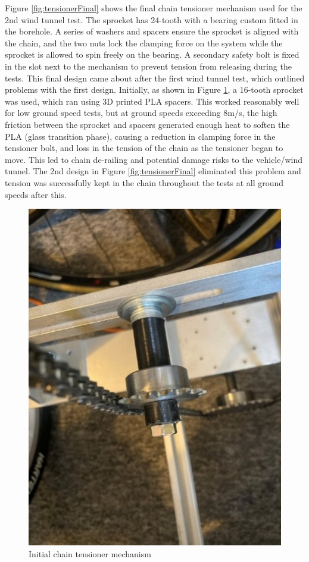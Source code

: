 Figure \ref{fig:tensionerFinal} shows the final chain tensioner mechanism used for the 2nd wind tunnel test. The sprocket has 24-tooth with a bearing custom fitted in the borehole. A series of washers and spacers ensure the sprocket is aligned with the chain, and the two nuts lock the clamping force on the system while the sprocket is allowed to spin freely on the bearing. A secondary safety bolt is fixed in the slot next to the mechanism to prevent tension from releasing during the tests. This final design came about after the first wind tunnel test, which outlined problems with the first design. Initially, as shown in Figure \ref{fig:tensionerInitial}, a 16-tooth sprocket was used, which ran using 3D printed PLA spacers. This worked reasonably well for low ground speed tests, but at ground speeds exceeding 8m/s, the high friction between the sprocket and spacers generated enough heat to soften the PLA (glass transition phase), causing a reduction in clamping force in the tensioner bolt, and loss in the tension of the chain as the tensioner began to move. This led to chain de-railing and potential damage risks to the vehicle/wind tunnel. The 2nd design in Figure \ref{fig:tensionerFinal} eliminated this problem and tension was successfully kept in the chain throughout the tests at all ground speeds after this.

\begin{figure}[!htbp]
    \centering
    \includegraphics{images/part9/chainTensionerInitial.jpg}
    \caption{Initial chain tensioner mechanism}
    \label{fig:tensionerInitial}
\end{figure}

